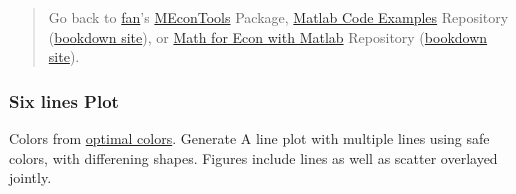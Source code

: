 \documentclass[
]{book}
\begin{document}
\begin{quote}
Go back to \href{http://fanwangecon.github.io/}{fan}'s \href{https://fanwangecon.github.io/MEconTools/}{MEconTools} Package, \href{https://fanwangecon.github.io/M4Econ/}{Matlab Code Examples} Repository (\href{https://fanwangecon.github.io/M4Econ/bookdown}{bookdown site}), or \href{https://fanwangecon.github.io/Math4Econ/}{Math for Econ with Matlab} Repository (\href{https://fanwangecon.github.io/Math4Econ/bookdown}{bookdown site}).
\end{quote}

\hypertarget{six-lines-plot}{%
\subsubsection{Six lines Plot}\label{six-lines-plot}}

Colors from \href{http://ksrowell.com/blog-visualizing-data/2012/02/02/optimal-colors-for-graphs/}{optimal
colors}.
Generate A line plot with multiple lines using safe colors, with
differening shapes. Figures include lines as well as scatter overlayed
jointly.
\end{document}
